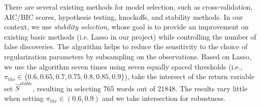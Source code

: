\documentclass[12pt]{article}
\begin{document}
	There are several existing methods for model selection, such as cross-validation, AIC/BIC scores, hypothesis testing, knockoffs, and stability methods. In our context, we use \textit{stability selection}\cite{meinshausen2010stability}, whose goal is to provide an improvement on existing basic methods (i.e. Lasso in our project) while controlling the number of false discoveries. The algorithm helps to reduce the sensitivity to the choice of regularization parameters by subsampling on the observations. Based on Lasso, we use the algorithm seven times using seven equally spaced thresholds (i.e., $\pi_{thr}\in \{0.6, 0.65, 0.7, 0.75, 0.8, 0.85, 0.9\}$), take the intersect of the return variable set $\hat{S}^{stable}$, resulting in selecting 765 words out of 21848. The results vary little when setting $\pi_{thr}\in (0.6, 0.9)$ and we take intersection for robustness.
	

	
\end{document}
